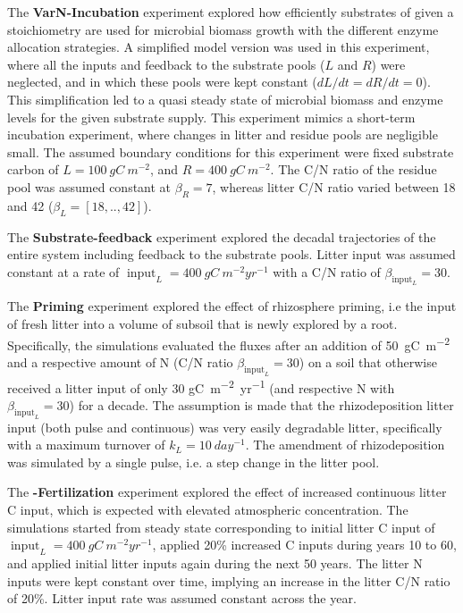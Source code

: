 The \textbf{VarN-Incubation} experiment explored how efficiently substrates
of given a stoichiometry are used for microbial biomass growth with the
different enzyme allocation strategies. A simplified model version was used in
this experiment, where all the inputs and feedback to the substrate pools ($L$
and $R$) were neglected, and in which these pools were kept constant ($dL/dt =
dR/dt = 0$). This simplification led to a quasi steady state of microbial
biomass and enzyme levels for the given substrate supply. This experiment mimics
a short-term incubation experiment, where changes in litter and residue pools
are negligible small. The assumed boundary conditions for this experiment were
fixed substrate carbon of $L=100~\unit{gC~m^{-2}}$, and $R=400~
\unit{gC~m^{-2}}$. The C/N ratio of the residue pool was assumed constant at
$\beta_R=7$, whereas litter C/N ratio varied between 18 and 42 ($\beta_L =
[18,..,42]$).

The \textbf{Substrate-feedback} experiment explored the decadal trajectories of
the entire system including feedback to the substrate pools. Litter input was
assumed constant at a rate of $\operatorname{input}_L =
400~\unit{gC~m^{-2}yr^{-1}}$ with a C/N ratio of $\beta_{\operatorname{input}_L}
= 30$.

The \textbf{Priming} experiment explored the effect of rhizosphere priming, i.e
the input of fresh litter into a volume of subsoil that is newly explored by a
root. Specifically, the simulations evaluated the fluxes after an addition of
50~\unit{gC~m^{-2}} and a respective amount of N (C/N ratio
$\beta_{\operatorname{input}_L} = 30$) on a soil that otherwise received a
litter input of only 30 \unit{gC~m^{-2}yr^{-1}} (and respective N with
$\beta_{\operatorname{input}_L} = 30$) for a decade. The assumption is made that
the rhizodeposition litter input (both pulse and continuous) was very easily
degradable litter, specifically with a maximum turnover of $k_L =
10~\unit{day^{-1}}$. The amendment of rhizodeposition was simulated by a single
pulse, i.e. a step change in the litter pool.

The \textbf{-Fertilization} experiment explored the effect of
increased continuous litter C input, which is expected with elevated atmospheric
 concentration.
The simulations started from steady state corresponding to initial litter C
input of $\operatorname{input}_L = 400~\unit{gC~m^{-2}yr^{-1}}$, applied 20\%
increased C inputs during years 10 to 60, and applied initial litter inputs
again during the next 50 years. The litter N inputs were kept constant over
time, implying an increase in the litter C/N ratio of 20\%. Litter input rate
was assumed constant across the year.

